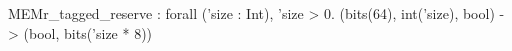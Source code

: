 MEMr_tagged_reserve : forall ('size : Int), 'size > 0. (bits(64), int('size), bool) -> (bool, bits('size * 8))